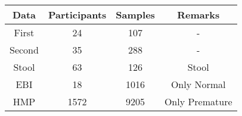 \begin{tabular}{c|ccc}
    Data & Participants & Samples & Remarks \\ \hline
    First & 24 & 107 & - \\
    Second & 35 & 288 & - \\
    Stool & 63 & 126 & Stool \\
    EBI & 18 & 1016 & Only Normal \\
    HMP & 1572 & 9205 & Only Premature \\
\end{tabular}
